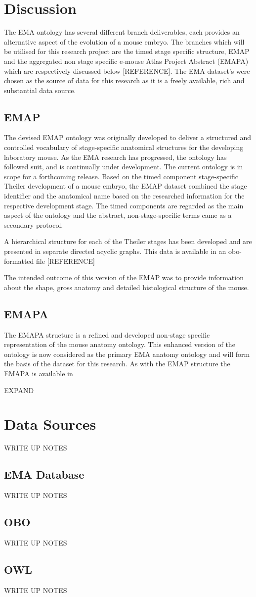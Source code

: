 \section{Discussion}
The EMA ontology has several different branch deliverables, each provides an alternative aspect of the evolution of a mouse embryo. The branches which will be utilised for this research project are the timed stage specific structure, EMAP and the aggregated non stage specific e-mouse Atlas Project Abstract (EMAPA) which are respectively discussed below [REFERENCE]. The EMA dataset's were chosen as the source of data for this research as it is a freely available, rich and substantial data source.

\subsection{EMAP}
The devised EMAP ontology was originally developed to deliver a structured and controlled vocabulary of stage-specific anatomical structures for the developing laboratory mouse. As the EMA research has progressed, the ontology has followed suit, and is continually under development. The current ontology is in scope for a forthcoming release.
Based on the timed component stage-specific Theiler development of a mouse embryo, the EMAP dataset combined the stage identifier and the anatomical name based on the researched information for the respective development stage. The timed components are regarded as the main aspect of the ontology and the abstract, non-stage-specific terms came as a secondary protocol.

A hierarchical structure for each of the Theiler stages has been developed and are presented in separate directed acyclic graphs. This data is available in an obo-formatted file [REFERENCE]

The intended outcome of this version of the EMAP was to provide information about the shape, gross anatomy and detailed histological structure of the mouse.

\subsection{EMAPA}
The EMAPA structure is a refined and developed non-stage specific representation of the mouse anatomy ontology. This enhanced version of the ontology is now considered as the primary EMA anatomy ontology and will form the basis of the dataset for this research. As with the EMAP structure the EMAPA is available in 

EXPAND
\section{Data Sources}
WRITE UP NOTES
\subsection{EMA Database}
WRITE UP NOTES
\subsection{OBO}
WRITE UP NOTES
\subsection{OWL}
WRITE UP NOTES
